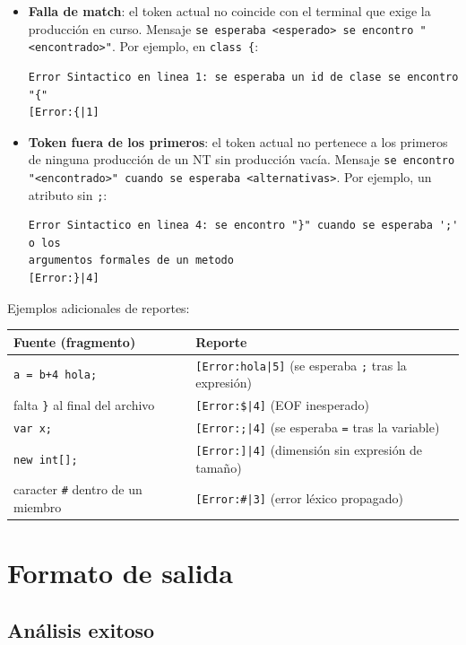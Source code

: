 \documentclass[11pt,a4paper]{article}
\begin{document}
\begin{itemize}
  \item \textbf{Falla de match}: el token actual no coincide con el terminal que exige la
        producción en curso. Mensaje \texttt{se esperaba <esperado> se encontro "<encontrado>"}.
        Por ejemplo, en \verb!class {!:
{\footnotesize
\begin{verbatim}
Error Sintactico en linea 1: se esperaba un id de clase se encontro "{"
[Error:{|1]
\end{verbatim}}
  \item \textbf{Token fuera de los primeros}: el token actual no pertenece a los primeros
        de ninguna producción de un NT sin producción vacía. Mensaje
        \texttt{se encontro "<encontrado>" cuando se esperaba <alternativas>}. Por ejemplo,
        un atributo sin \verb!;!:
{\footnotesize
\begin{verbatim}
Error Sintactico en linea 4: se encontro "}" cuando se esperaba ';' o los
argumentos formales de un metodo
[Error:}|4]
\end{verbatim}}
\end{itemize}

Ejemplos adicionales de reportes:

\begin{center}
{\footnotesize
\setlength{\tabcolsep}{4pt}
\begin{tabular}{|l|l|}
\hline
\textbf{Fuente (fragmento)} & \textbf{Reporte} \\ \hline
\verb!a = b+4 hola;! & \texttt{[Error:hola|5]} (se esperaba \verb!;! tras la expresión) \\ \hline
falta \verb!}! al final del archivo & \verb![Error:$|4]! (EOF inesperado) \\ \hline
\verb!var x;! & \texttt{[Error:;|4]} (se esperaba \verb!=! tras la variable) \\ \hline
\verb!new int[];! & \texttt{[Error:]|4]} (dimensión sin expresión de tamaño) \\ \hline
caracter \verb!#! dentro de un miembro & \verb![Error:#|3]! (error léxico propagado) \\ \hline
\end{tabular}
}
\end{center}

\section{Formato de salida}

\subsection{Análisis exitoso}
\end{document}
